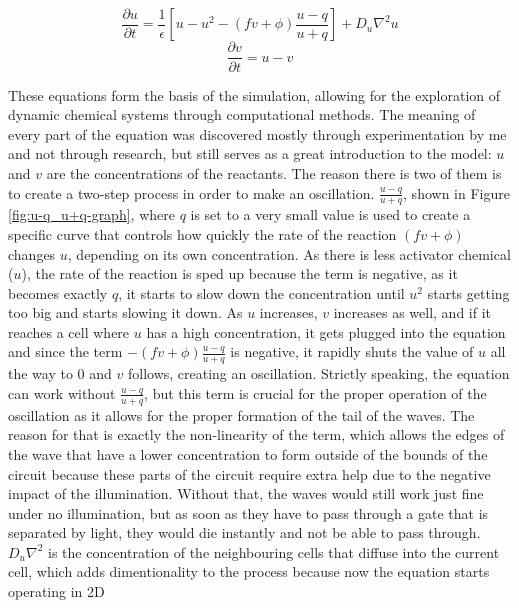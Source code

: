 \begin{equation}
    \frac{\partial u}{\partial t} = \frac{1}{\epsilon} \left[ u - u^2 - (fv + \phi) \frac{u - q}{u + q} \right] + D_u \nabla^2 u
    \label{eq:u-partial-t}
\end{equation}
\begin{equation}
    \frac{\partial v}{\partial t} = u - v
    \label{eq:v-partial-t}
\end{equation}


These equations form the basis of the simulation, allowing for the exploration of dynamic chemical systems through computational methods.
The meaning of every part of the equation was discovered mostly through experimentation by me and not through research, but still serves as a great introduction to the model:
$u$ and $v$ are the concentrations of the reactants. The reason there is two of them is to create a two-step process in order to make an oscillation.
$\frac{u - q}{u + q}$, shown in Figure \ref{fig:u-q_u+q-graph}, where $q$ is set to a very small value is used to create a specific curve that controls how quickly the rate of the reaction $(fv + \phi)$ changes $u$, 
depending on its own concentration. As there is less activator chemical ($u$), the rate of the reaction is sped up because the term is negative, as it becomes exactly $q$, 
it starts to slow down the concentration until $u^2$ starts getting too big and starts slowing it down. 
As $u$ increases, $v$ increases as well, and if it reaches a cell where $u$ has a high concentration, 
it gets plugged into the equation and since the term $- (fv + \phi) \frac{u - q}{u + q}$ is negative, 
it rapidly shuts the value of $u$ all the way to 0 and $v$ follows, creating an oscillation.
Strictly speaking, the equation can work without $\frac{u - q}{u + q}$, but this term is crucial for the proper operation of the oscillation as it allows for the 
proper formation of the tail of the waves. The reason for that is exactly the non-linearity of the term, which allows the edges of the wave that have a lower concentration
to form outside of the bounds of the circuit because these parts of the circuit require extra help due to the negative impact of the illumination. Without that, the 
waves would still work just fine under no illumination, but as soon as they have to pass through a gate that is separated by light, they would die instantly and not be able to pass through.
$D_u \nabla^2$ is the concentration of the neighbouring cells that diffuse into the current cell, which adds dimentionality to the process because now the equation starts operating in 2D 
